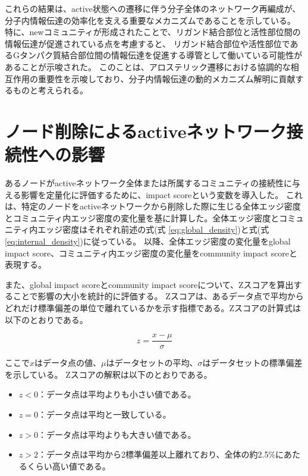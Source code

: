 これらの結果は、active状態への遷移に伴う分子全体のネットワーク再編成が、分子内情報伝達の効率化を支える重要なメカニズムであることを示している。
特に、newコミュニティが形成されたことで、リガンド結合部位と活性部位間の情報伝達が促進されている点を考慮すると、
リガンド結合部位や活性部位であるGタンパク質結合部位間の情報伝達を促進する導管として働いている可能性があることが示唆された。
このことは、アロステリック遷移における協調的な相互作用の重要性を示唆しており、分子内情報伝達の動的メカニズム解明に貢献するものと考えられる。


\section{ノード削除によるactiveネットワーク接続性への影響}

あるノードがactiveネットワーク全体または所属するコミュニティの接続性に与える影響を定量化に評価するために、impact scoreという変数を導入した。
これは、特定のノードをactiveネットワークから削除した際に生じる全体エッジ密度とコミュニティ内エッジ密度の変化量を基に計算した。全体エッジ密度とコミュニティ内エッジ密度はそれぞれ前述の式(式 \ref{eq:global_density})と式(式 \ref{eq:internal_density})に従っている。
以降、全体エッジ密度の変化量をglobal impact score、コミュニティ内エッジ密度の変化量をcommunity impact scoreと表現する。

また、global impact scoreとcommunity impact scoreについて、Zスコアを算出することで影響の大小を統計的に評価する。
Zスコアは、あるデータ点で平均からどれだけ標準偏差の単位で離れているかを示す指標である。Zスコアの計算式は以下のとおりである。

\[
z = \frac{x - \mu}{\sigma}
\]

ここで$x$はデータ点の値、$\mu$はデータセットの平均、$\sigma$はデータセットの標準偏差を示している。
Zスコアの解釈は以下のとおりである。
\begin{itemize}
    \item \( z < 0 \)：データ点は平均よりも小さい値である。
    \item \( z = 0 \)：データ点は平均と一致している。
    \item \( z > 0 \)：データ点は平均よりも大きい値である。
    \item \( z > 2 \)：データ点は平均から2標準偏差以上離れており、全体の約2.5\%にあたるくらい高い値である。
\end{itemize}

